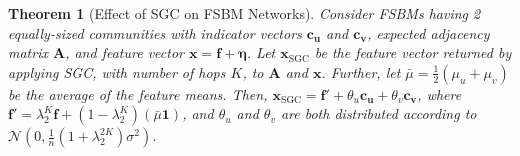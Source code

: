 \documentclass{article}
\newcommand{\tp}{{\scriptscriptstyle +}}
\newcommand{\tm}{{\scriptscriptstyle -}}
\newtheorem{theorem}{Theorem}
\begin{document}
\begin{theorem}[Effect of SGC on FSBM Networks]
Consider FSBMs having 2 equally-sized communities with indicator vectors $\bm{c_u}$ and $\bm{c_v}$, expected adjacency matrix $\bm{A}$, and feature vector $\bm{x} = \bm{f} + \bm{\eta}$. Let $\bm{x}_\text{SGC}$ be the feature vector returned by applying SGC, with number of hops $K$, to $\bm{A}$ and $\bm{x}$. Further, let $\bar{\mu} = \tfrac{1}{2}(\mu_u + \mu_v)$ be the average of the feature means. Then, $\bm{x}_\text{SGC} = \bm{f}' + \theta_u \bm{c_u} + \theta_v \bm{c_v}$, where $\bm{f}' = \lambda_2^K \bm{f} + (1 - \lambda_2^K) (\bar{\mu} \bm{1})$, and $\theta_u$ and $\theta_v$ are both distributed according to $\mathcal{N}\left( 0, \tfrac{1}{n} (1 + \lambda_2^{2K}) \sigma^2 \right)$.
\end{theorem}
%
\end{document}
